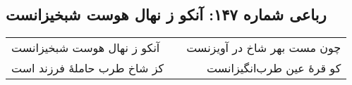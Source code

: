\begin{center}
\section*{رباعی شماره ۱۴۷: آنکو ز نهال هوست شبخیزانست}
\label{sec:0147}
\begin{longtable}{l p{0.5cm} r}
آنکو ز نهال هوست شبخیزانست
&&
چون مست بهر شاخ در آویزنست
\\
کز شاخ طرب حاملهٔ فرزند است
&&
کو قرهٔ عین طرب‌انگیزانست
\\
\end{longtable}
\end{center}
